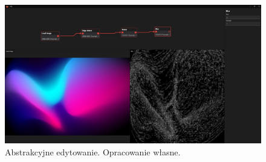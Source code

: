 \begin{figure}[H]
    \centering
    \includegraphics[width=1\linewidth]{images/Picture30.jpg}
    \caption{Abstrakcyjne edytowanie. Opracowanie własne.}
    \label{fig:abstract}
\end{figure} 